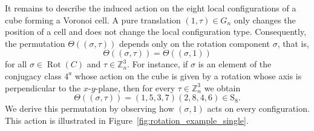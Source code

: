 \documentclass[12pt]{article}
\theoremstyle{definition}
\theoremstyle{remark}
\DeclareMathOperator{\Rot}{Rot}
\begin{document}
It remains to describe the induced action on the eight local configurations of a cube forming a Voronoi cell. A pure translation $(1,\tau)\in G_n$ only changes the position of a cell and does not change the local configuration type. Consequently, the permutation $\Theta((\sigma,\tau))$ depends only on the rotation component $\sigma$, that is,
\[
\Theta((\sigma,\tau))=\Theta((\sigma,1))
\]
for all $\sigma\in \Rot(C)$ and $\tau\in \mathbb Z_n^3$. For instance, if $\sigma$ is an element of the conjugacy class $4^a$ whose action on the cube is given by a rotation whose axis is perpendicular to the $x$-$y$-plane, then for every $\tau\in \mathbb{Z}_n^3$ we obtain
\[
\Theta((\sigma,\tau))=(1,5,3,7)(2,8,4,6)\in \mathrm{S}_8.
\]
We derive this permutation by observing how $(\sigma,1)$ acts on every configuration. 
This action is illustrated in Figure~\ref{fig:rotation_example_single}.
\end{document}
